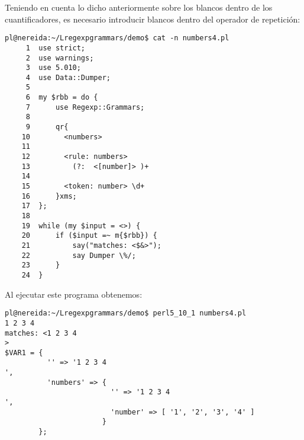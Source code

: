 Teniendo en cuenta lo dicho anteriormente sobre los blancos
dentro de los cuantificadores, es necesario introducir
blancos dentro del operador de repetición:
\begin{verbatim}
pl@nereida:~/Lregexpgrammars/demo$ cat -n numbers4.pl
     1  use strict;
     2  use warnings;
     3  use 5.010;
     4  use Data::Dumper;
     5
     6  my $rbb = do {
     7      use Regexp::Grammars;
     8
     9      qr{
    10        <numbers>
    11
    12        <rule: numbers>
    13          (?:  <[number]> )+
    14
    15        <token: number> \d+
    16      }xms;
    17  };
    18
    19  while (my $input = <>) {
    20      if ($input =~ m{$rbb}) {
    21          say("matches: <$&>");
    22          say Dumper \%/;
    23      }
    24  }
\end{verbatim}
Al ejecutar este programa obtenemos:
\begin{verbatim}
pl@nereida:~/Lregexpgrammars/demo$ perl5_10_1 numbers4.pl
1 2 3 4
matches: <1 2 3 4
>
$VAR1 = {
          '' => '1 2 3 4
',
          'numbers' => {
                         '' => '1 2 3 4
',
                         'number' => [ '1', '2', '3', '4' ]
                       }
        };
\end{verbatim}


